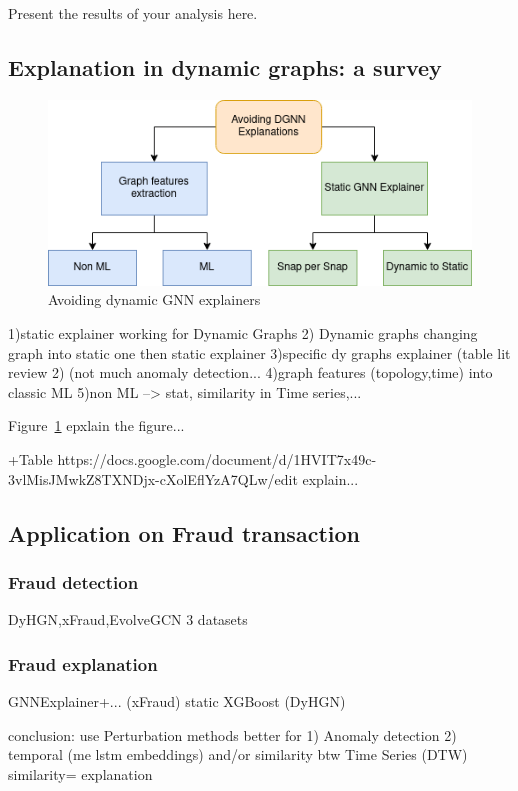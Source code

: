 Present the results of your analysis here.

\subsection{Explanation in dynamic graphs: a survey}


\begin{figure}[!h]
    \centering \includegraphics[width = 355pt]{Thesis_group_report_template_liris_en/Images/Avoiding DGNN Explainability Diagram.drawio.png}
    \caption{Avoiding dynamic GNN explainers} \label{fig:image}
    \label{other expl}
\end{figure}

1)static explainer working for Dynamic Graphs
2) Dynamic graphs changing graph into static one then static explainer
3)specific dy graphs explainer (table lit review 2) (not much anomaly detection...
4)graph features (topology,time) into classic ML
5)non ML --> stat, similarity in Time series,...

Figure~\ref{other expl} epxlain the figure...

+Table https://docs.google.com/document/d/1HVIT7x49c-3vlMisJMwkZ8TXNDjx-cXolEflYzA7QLw/edit explain...

\subsection{Application on Fraud transaction}

\subsubsection{Fraud detection}
DyHGN,xFraud,EvolveGCN
3 datasets

\subsubsection{Fraud explanation}
GNNExplainer+... (xFraud) static
XGBoost (DyHGN)

conclusion: use Perturbation methods better for 1) Anomaly detection 2) temporal (me lstm embeddings)
and/or similarity btw Time Series (DTW) similarity= explanation